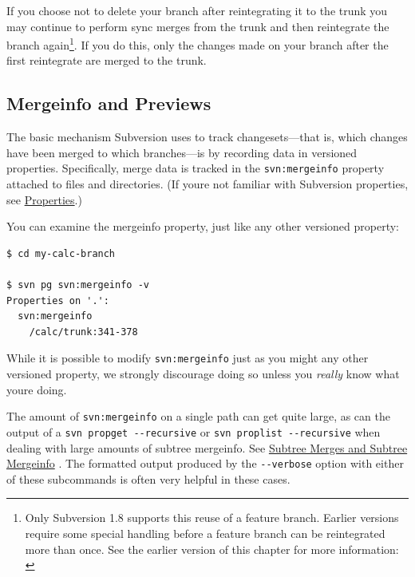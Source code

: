 If you choose not to delete your branch after reintegrating it to the
trunk you may continue to perform sync merges from the trunk and then
reintegrate the branch again\footnote{Only Subversion 1.8 supports this
  reuse of a feature branch. Earlier versions require some special
  handling before a feature branch can be reintegrated more than once.
  See the earlier version of this chapter for more information:
  \href{https://svnbook.red-bean.com/en/1.7/svn.branchmerge.basicmerging.html\#svn.branchemerge.basicmerging.reintegrate}{}}.
If you do this, only the changes made on your branch after the first
reintegrate are merged to the trunk.

\subsection{Mergeinfo and
Previews}\label{svn.branchmerge.basicmerging.mergeinfo}

The basic mechanism Subversion uses to track changesets---that is, which
changes have been merged to which branches---is by recording data in
versioned properties. Specifically, merge data is tracked in the
\texttt{svn:mergeinfo} property attached to files and directories. (If
you\textquotesingle re not familiar with Subversion properties, see
\hyperref[svn.advanced.props]{Properties}.)

You can examine the mergeinfo property, just like any other versioned
property:

\begin{verbatim}
$ cd my-calc-branch

$ svn pg svn:mergeinfo -v
Properties on '.':
  svn:mergeinfo
    /calc/trunk:341-378
\end{verbatim}

While it is possible to modify \texttt{svn:mergeinfo} just as you might
any other versioned property, we strongly discourage doing so unless you
\emph{really} know what you\textquotesingle re doing.

The amount of \texttt{svn:mergeinfo} on a single path can get quite
large, as can the output of a \texttt{svn\ propget\ -\/-recursive} or
\texttt{svn\ proplist\ -\/-recursive} when dealing with large amounts of
subtree mergeinfo. See
\hyperref[svn.branchmerge.basicmerging.stayinsync.subtree]{Subtree
Merges and Subtree Mergeinfo} . The formatted output produced by the
\texttt{-\/-verbose} option with either of these subcommands is often
very helpful in these cases.

